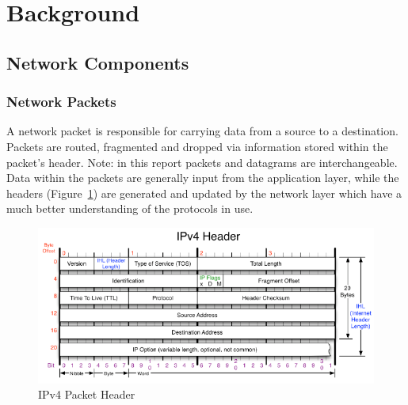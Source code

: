 \documentclass[interim_report.tex]{subfiles}
\begin{document}
\section{Background}
\subsection{Network Components}
\subsubsection{Network Packets}
A network packet is responsible for carrying data from a source to a destination. Packets are routed, fragmented and dropped via information stored within the packet's header. Note: in this report packets and datagrams are interchangeable. Data within the packets are generally input from the application layer, while the headers (Figure~\ref{fig:ipv4}) are generated and updated by the network layer which have a much better understanding of the protocols in use.

\begin{figure}[H]
	\centering
	\includegraphics[width=\textwidth]{img/ipv4header.png}
	\caption{IPv4 Packet Header \cite{ipv6}}
	\label{fig:ipv4}
\end{figure}
\end{document}
